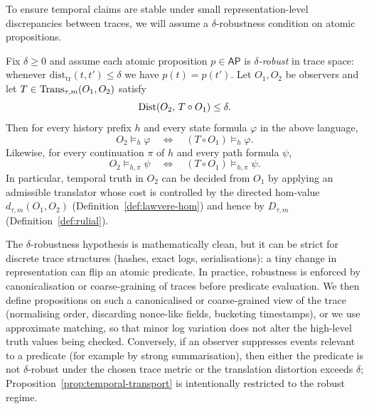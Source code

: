 \documentclass{aion}
\begin{document}
To ensure temporal claims are stable under small representation-level discrepancies between traces, we will assume a $\delta$-robustness condition on atomic propositions.

\begin{proposition}\label{prop:temporal-transport}
Fix $\delta\ge 0$ and assume each atomic proposition $p\in\mathsf{AP}$ is \emph{$\delta$-robust} in trace space:
whenever $\mathrm{dist}_{\mathrm{tr}}(t,t')\le\delta$ we have $p(t)=p(t')$.
Let $O_1,O_2$ be observers and let $T\in\operatorname{Trans}_{\tau,m}(O_1,O_2)$ satisfy
\[
  \operatorname{Dist}(O_2,\,T\circ O_1)\le \delta.
\]
Then for every history prefix $h$ and every state formula $\varphi$ in the above language,
\[
  O_2 \models_h \varphi
  \quad\Longleftrightarrow\quad
  (T\circ O_1)\models_h \varphi.
\]
Likewise, for every continuation $\pi$ of $h$ and every path formula $\psi$,
\[
  O_2 \models_{h,\pi} \psi
  \quad\Longleftrightarrow\quad
  (T\circ O_1)\models_{h,\pi} \psi.
\]
In particular, temporal truth in $O_2$ can be decided from $O_1$ by applying an admissible translator whose cost is controlled by
the directed hom-value $d_{\tau,m}(O_1,O_2)$ (Definition~\ref{def:lawvere-hom}) and hence by $D_{\tau,m}$ (Definition~\ref{def:rulial}).
\end{proposition}

\begin{remark}
The $\delta$-robustness hypothesis is mathematically clean, but it can be strict for discrete trace structures
(hashes, exact logs, serialisations): a tiny change in representation can flip an atomic predicate.
In practice, robustness is enforced by canonicalisation or coarse-graining of traces before predicate evaluation.
We then define propositions on such a canonicalised or coarse-grained view of the trace
(normalising order, discarding nonce-like fields, bucketing timestamps), or we use approximate matching,
so that minor log variation does not alter the high-level truth values being checked.
Conversely, if an observer suppresses events relevant to a predicate (for example by strong summarisation), then either the predicate is not $\delta$-robust under the chosen trace metric or the translation distortion exceeds $\delta$; Proposition~\ref{prop:temporal-transport} is intentionally restricted to the robust regime.
\end{remark}
\end{document}
